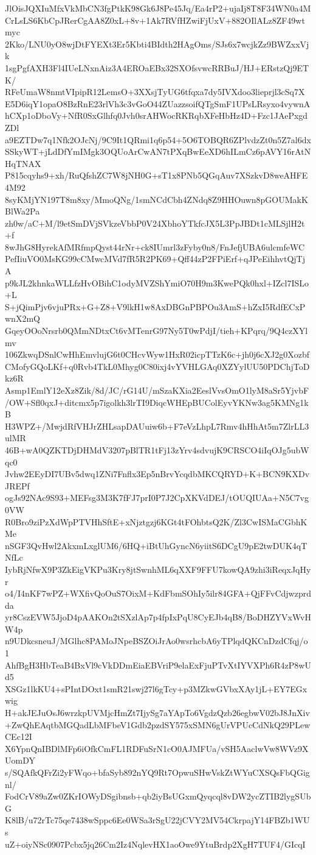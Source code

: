 JlOisJQXIuMfxVkMbCN3fgPtkK98Gk6J8Pe45Jq/Ea4rP2+ujaIj8T8F34WN0a4M
CrLsLS6KbCpJRerCgAA8Z0xL+8v+1Ak7RVfHZwiFjUxV+882OIlALz8ZF49wtmyc
2Kko/LNU0yO8wjDtFYEXt3Er5Kbti4BIdth2HAgOms/SJs6x7wcjkZz9BWZxxVjk
1sgPgfAXH3Fl4IUeLNxnAiz3A4EROaEBx32SXOfsvwcRRBuJ/HJ+ERstzQj9ETK/
RFeUmaW8nmtVIpipR12LemsO+3XXsjTyUG6tfqxa7dy5IVXdoo3lieprjl3cSq7X
E5D6iqY1opaO8BzRnE23rlVh3c3vGoO44ZUazzsoifQTgSmF1UPsLRsyxo4vywnA
hCXp1oDboVy+NfR0SxGlhfq0Jvh0srAHWocRKRqbXFeHbHz4D+Fzc1JAePxgdZDl
a9EZTDw7q1Nfk2OJcNj/9C9It1QRmi1q6p54+5O6TOBQR6ZPlvdzZt0n5Z7al6dx
SSkyWT+jLdDfYmIMgk3OQUoArCwAN7tPXqBwEeXD6hILmCz6pAVY16rAtNHqTNAX
P815cqyhs9+xh/RuQfshZC7W8jNH0G+sT1x8PNb5QGqAuv7XSzkvD8weAHFE4M92
8syKMjYN197T8m8xy/MmoQNg/1smNCdCbh4ZNdq8Z9HHOuwn8pGOUMakKBlWa2Pa
zh0w/aC+M/l9etSmDVjSVkzeVbbP0V24XbhoYTkfcJX5L3PpJBDt1cMLSjlH2t+f
8wJhG8HyrekAfMRfmpQyst44rNr+ck8IUmrl3zFyby0n8/FnJefjUBA6ulcmfeWC
PefIiuVO0MsKG99cCMwcMVd7fR5R2PK69+Qff44zP2FPiErf+qJPeEihhvtQjTjA
p9kJL2khnkaWLLfzHvOBihC1odyMVZShYmiO70H9m3KwePQk0hxl+IZcl7ISLo+L
S+jQimPjv6vjuPRx+G+Z8+V9lkH1w8AxDBGnPBPOu3AmS+hZxI5RdfECxPwnX2mQ
GqeyOOoNrsrb0QMmNDtxCt6vMTenrG97Ny5T0wPdjI/tieh+KPqrq/9Q4czXYlmv
106ZkwqDSnlCwHhEmvlujG6t0CHcvWyw1HxR02icpTTzK6c+jh0j6cXJ2g0Xozbf
CMofyGQoLKf+q0Rvb4TkL0Mhyg0C80ixj4vYVHLGAq0XZYylUU50PDChjToDkz6R
Asmp1EmlY12eXz8Zik/8d/JC/rG14U/mSzaKXia2EeslVvsOmO1lyM8aSr5YjvbF
/OW+Sfl0qxJ+ditcmx5p7igolkh3lrTI9DiqcWHEpBUColEyvYKNw3ag5KMNg1kB
H3WPZ+/MwjdRfVHJrZHLsapDAUuiw6b+F7eVzLhpL7Rmv4hHhAt5m7ZlrLL3ulMR
46B+wA0QZKTDjDHMdV3207pBlTR1tFj13zYrv4sdvujK9CRSCO4iIqOJg5ubWqc0
Jvhw2EEyDI7UBv5dwq1ZNi7Fnflx3Ep5nBrvYcqdbMKCQRYD+K+BCN9KXDvJREPf
ogJs92NAc9S93+MEFsg3M3K7fFJ7prI0P7J2CpXKVdDEJ/tOUQIUAa+N5C7vg0VW
R0Bro9ziPzXdWpPTVHhSftE+xNjztgzj6KGt4tFOhbtsQ2K/Zl3CwISMaCGbhKMe
nSGF3QvHwl2AkxmLxglUM6/6HQ+iBtUhGyncN6yiitS6DCgU9pE2twDUK4qTNfLc
IybRjNfwX9P3ZkEigVKPu3Kry8jtSwnhML6qXXF9FFU7kowQA9zhi3iReqxJqHyr
o4/I4nKF7wPZ+WXfivQoOuS7OixM+KdFbmSOhIy5ilr84GFA+QjFFvCdjwzprdda
yr8CszEVW5JjoD4pAAKOn2tSXzlAp7p4fpIxPqU8CyEJb4qB8/BoDHZYVxWvHW4p
n9UDkcsneuJ/MGlhc8PAMoJNpeBSZOiJrAo0wsrhcbA6yTPlqdQKCnDzdCfqj/o1
AhfBgH3HbTeaB4BxVl9cVkDDmEiaEBVriP9elaExFjuPTvXtIYVXPh6R4zP8wUd5
XSGz1lkKU4+sPIntDOxt1smR21swj27l6gTcy+p3MZkwGVbxXAy1jL+EY7EGxwig
H+akJEJuOsJ6wrzkpUVMjcHmZt7IjySg7aYApTo6VgdzQzb26egbwV02bJ8JnXiv
+ZwQhEAqtbMGQadLbMFbeV1Gdb2pzdSY575xSMN6gUrVPUcCdNkQ29PLewCEc12I
X6YpnQnIBDlMFp6iOfkCmFL1RDFuSrN1cO0AJMFUa/vSH5AaclwVw8WVz9XUomDY
s/SQAfkQFrZi2yFWqo+bfaSyb892nYQ9Rt7OpwuSHwVskZtWYuCXSQsFbQGignl/
FodCrV89aZw0ZKrIOWyDSgibnsb+qb2iyBsUGxmQyqcql8vDW2ycZTIB2lygSUbG
K8lB/u72rTc75qe7438wSppc6Ee0WSa3rSgU22jCVY2MV54CkrpajY14FBZb1WUs
uZ+oiyNSc0907Pcbx5jq26Cm2Iz4NqlevHX1aoOwe9YtuBrdp2XgH7TUF4/GIcqI
